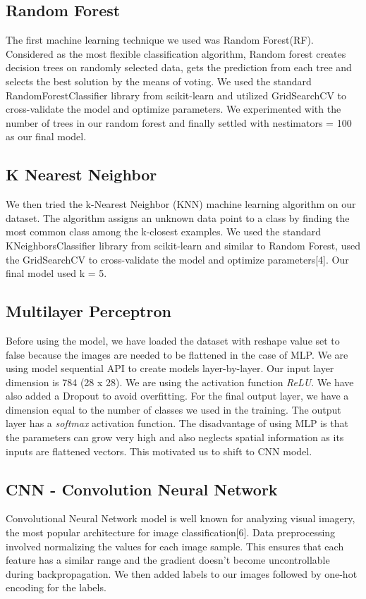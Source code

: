 \documentclass{article} %
\begin{document}
\subsection{Random Forest}

The first machine learning technique we used was Random Forest(RF). Considered as the most flexible classification algorithm, Random forest creates decision trees on randomly selected data, gets the prediction from each tree and selects the best solution by the means of voting. 
We used the standard RandomForestClassifier library from scikit-learn and utilized GridSearchCV to cross-validate the model and optimize parameters. We experimented with the number of trees in our random forest and finally settled with n\textunderscore estimators = 100 as our final model.

\subsection{K Nearest Neighbor}
\label{knn}
We then tried the k-Nearest Neighbor (KNN) machine learning algorithm on our dataset. The algorithm assigns an unknown data point to a class by finding the most common class among the k-closest examples.  We used the standard KNeighborsClassifier library from scikit-learn and similar to Random Forest, used the GridSearchCV to cross-validate the model and optimize parameters[4]. Our final model used k = 5.

\subsection{Multilayer Perceptron}
\label{mlp}
Before using the model, we have loaded the dataset with reshape value set to false because the images are needed to be flattened in the case of MLP. We are using model sequential API to create models layer-by-layer. Our input layer dimension is 784 (28 x 28). We are using the activation function \textit{ReLU}. We have also added a Dropout to avoid overfitting. For the final output layer, we have a dimension equal to the number of classes we used in the training. The output layer has a \textit{softmax} activation function.
The disadvantage of using MLP is that the parameters can grow very high and also neglects spatial information as its inputs are flattened vectors. This motivated us to shift to CNN model.

\subsection{CNN - Convolution Neural Network}
\label{cnn}
Convolutional Neural Network model is well known for analyzing visual imagery, the most popular architecture for image classification[6]. Data preprocessing involved normalizing the values for each image sample. This ensures that each feature has a similar range and the gradient doesn’t become uncontrollable during backpropagation. We then added labels to our images followed by one-hot encoding for the labels.
\end{document}
